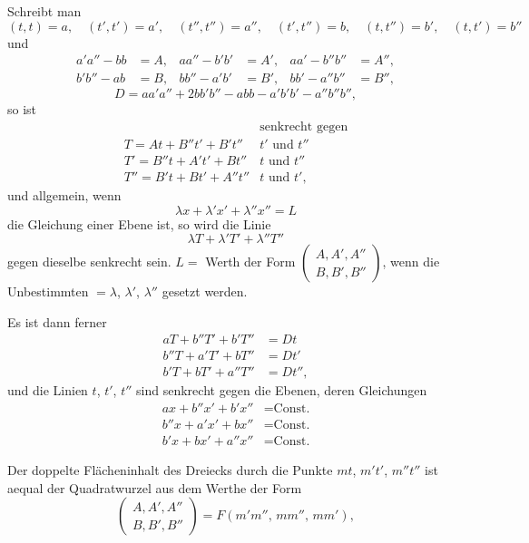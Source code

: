 
Schreibt man
{\small\[
(t,t) = a,\quad (t',t') = a',\quad (t'',t'') = a'',\quad (t',t'') = b,\quad (t,t'') = b',\quad (t,t') = b''
\]}
und
\[\begin{aligned}
a'a'' - bb &= A, & aa'' - b'b' &= A', & aa' - b''b'' &= A'', \\
b'b'' - ab &= B, & bb'' - a'b' &= B', & bb' - a''b'' &= B'',
\end{aligned}\]
\[
D = aa'a'' + 2bb'b'' - abb - a'b'b' - a''b''b'',
\]
so ist
\[
\begin{array}{ll}
 & \text{senkrecht gegen}\\
 T=At+B''t'+B't'' & t'\text{ und }t''\\
 T'=B''t+A't'+Bt'' & t\text{ und }t''\\
 T''=B't+Bt'+A''t'' & t\text{ und }t',
\end{array}
\]
und allgemein, wenn
\[
\lambda x + \lambda' x' + \lambda'' x'' = L
\]
die Gleichung einer Ebene ist, so wird die Linie
\[
\lambda T + \lambda' T' + \lambda'' T''
\]
gegen dieselbe senkrecht sein. $L =$ Werth der Form $\begin{pmatrix} A, A', A'' \\ B, B', B'' \end{pmatrix}$,
wenn die Unbestimmten $= \lambda$, $\lambda'$, $\lambda''$ gesetzt werden.

Es ist dann ferner
\[\begin{aligned}
aT + b''T' + b'T'' &= Dt \\
b''T + a'T' + bT'' &= Dt' \\
b'T + bT' + a''T'' &= Dt'',
\end{aligned}\]
und die Linien $t$, $t'$, $t''$ sind senkrecht gegen die Ebenen, deren Gleichungen
\[\begin{aligned}
ax + b''x' + b'x'' &= \text{Const.} \\
b''x + a'x' + bx'' &= \text{Const.} \\
b'x + bx' + a''x'' &= \text{Const.}
\end{aligned}\]

Der doppelte Flächeninhalt des Dreiecks durch die Punkte $mt$, $m't'$, $m''t''$ ist aequal
der Quadratwurzel aus dem Werthe der Form
\[
\begin{pmatrix} A, A', A'' \\ B, B', B'' \end{pmatrix} = F(m'm'',\, mm'',\, mm'),
\]

